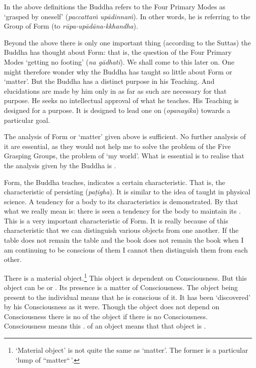 In the above definitions the Buddha refers to the Four Primary Modes as `grasped by oneself' (\emph{paccattaṁ upādinnaṁ}). In other words, he is referring to the  Group of Form (to \emph{rūpa-upādāna-kkhandha}).

Beyond the above there is only one important thing (according to the Suttas) the Buddha has thought about Form: that is, the question of the Four Primary Modes `getting no footing' (\emph{na gādhati}). We shall come to this later on. One might therefore wonder why the Buddha has taught so little about Form or `matter'. But the Buddha has a distinct purpose in his Teaching. And elucidations are made by him only in as far as such are necessary for that purpose. He seeks no intellectual approval of what he teaches. His Teaching is designed for a purpose. It is designed to lead one on (\emph{opanayika}) towards a particular goal.

The analysis of Form or `matter' given above is sufficient. No further analysis of it are essential, as they would not help me to solve the problem of the Five Grasping Groups, the problem of `my world'. What is essential is to realise that the analysis given by the Buddha is .

Form, the Buddha teaches, indicates a certain characteristic. That is, the characteristic of persisting (\emph{paṭigha}). It is similar to the idea of  taught in physical science. A tendency for a body to  its characteristics is demonstrated. By that what we really mean is: there is seen a tendency for the body to maintain its . This is a very important characteristic of Form. It is really because of this characteristic that we can distinguish various objects from one another. If the table does not remain the table and the book does not remain the book when I am continuing to be conscious of them I cannot then distinguish them from each other.

There is a material object.\footnote{`Material object' is not quite the same as `matter'. The former is a particular `lump of ``matter``\,'.} This object is  dependent on Consciousness. But this object can be  or . Its presence is a matter of Consciousness. The object being present to the individual means that he is conscious of it. It has been `discovered' by his Consciousness as it were. Though the object does not depend on Consciousness there is no  of the object if there is no Consciousness. Consciousness means this .  of an object means that that object is .

